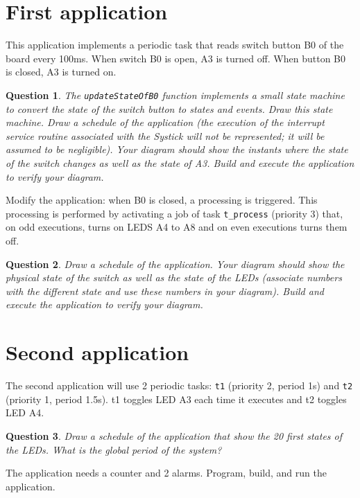 \documentclass[11pt]{report}
\newtheorem{ex}{Question}
\begin{document}
\section{First application}

This application implements a periodic task that reads switch button B0 of the board every 100ms.
When switch B0 is open, A3 is turned off.
When button B0 is closed, A3 is turned on.

\begin{ex}
    The \texttt{updateStateOfB0} function implements a small state machine to convert the state of the switch button to states and events.
    Draw this state machine.
    Draw a schedule of the application (the execution of the interrupt service routine associated with the Systick will not be represented; it will be assumed to be negligible).
    Your diagram should show the instants where the state of the switch changes as well as the state of A3.
    Build and execute the application to verify your diagram.
\end{ex}

Modify the application: when B0 is closed, a processing is triggered.
This processing is performed by activating a job of task \texttt{t_process} (priority 3) that, on odd executions, turns on LEDS A4 to A8 and on even executions turns them off.
\begin{ex}
Draw a schedule of the application.
Your diagram should show the physical state of the switch as well as the state of the LEDs (associate numbers with the different state and use these numbers in your diagram).
Build and execute the application to verify your diagram.
\end{ex}


\section{Second application}

The second application will use 2 periodic tasks: \texttt{t1} (priority 2, period 1s) and \texttt{t2} (priority 1, period 1.5s). t1 toggles LED A3 each time it executes and t2 toggles LED A4.

\begin{ex}
    Draw a schedule of the application that show the 20 first states of the LEDs.
    What is the global period of the system?
\end{ex}

The application needs a counter and 2 alarms. Program, build, and run the application.
\end{document}
